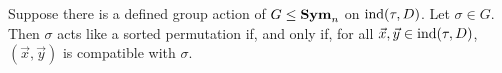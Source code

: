 \documentclass[../paper.tex]{subfiles}
\begin{document}



\begin{lem}
  Suppose there is a defined group action of $G \leq \text{\textbf{Sym}}_n$ on
  $\text{\upshape ind}(\tau, D)$. Let $\sigma \in G$. Then $\sigma$ acts like a sorted permutation if, and only if, for all $\vec{x}, \vec{y} \in
  \text{\upshape ind}(\tau, D)$, $(\vec{x}, \vec{y})$ is compatible with $\sigma$.
  \label{lem:isostab-compatible}
\end{lem}
\end{document}
